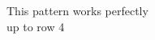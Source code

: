 \documentclass[preview]{standalone}
\begin{document}
\begin{center}
This pattern works perfectly\\up to row 4
\end{center}
\end{document}
